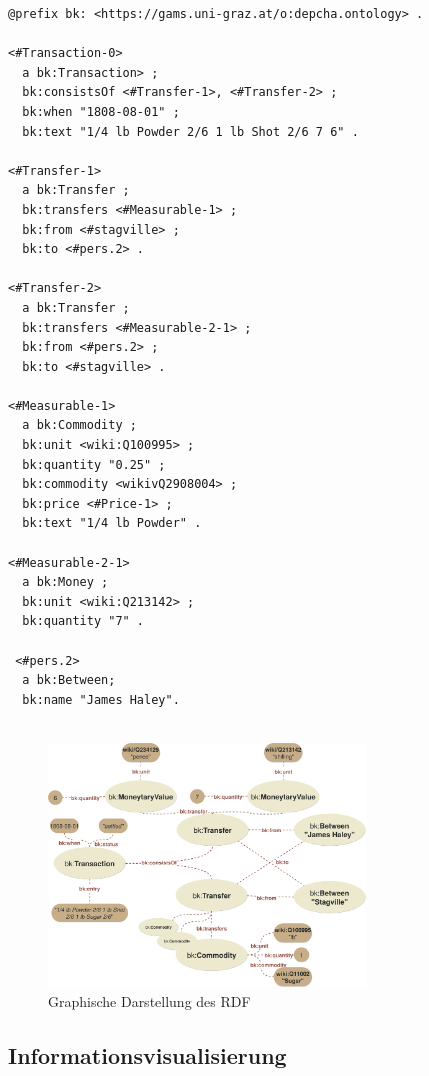 \documentclass[12pt,a4paper]{article}
\begin{document}
\begin{lstlisting}[]
@prefix bk: <https://gams.uni-graz.at/o:depcha.ontology> .

<#Transaction-0>
  a bk:Transaction> ;
  bk:consistsOf <#Transfer-1>, <#Transfer-2> ;
  bk:when "1808-08-01" ;
  bk:text "1/4 lb Powder 2/6 1 lb Shot 2/6 7 6" .

<#Transfer-1>
  a bk:Transfer ;
  bk:transfers <#Measurable-1> ;
  bk:from <#stagville> ;
  bk:to <#pers.2> .

<#Transfer-2>
  a bk:Transfer ;
  bk:transfers <#Measurable-2-1> ;
  bk:from <#pers.2> ;
  bk:to <#stagville> .

<#Measurable-1>
  a bk:Commodity ;
  bk:unit <wiki:Q100995> ;
  bk:quantity "0.25" ;
  bk:commodity <wikivQ2908004> ;
  bk:price <#Price-1> ;
  bk:text "1/4 lb Powder" .

<#Measurable-2-1>
  a bk:Money ;
  bk:unit <wiki:Q213142> ;
  bk:quantity "7" .
  
 <#pers.2>
  a bk:Between;
  bk:name "James Haley".
  
\end{lstlisting}

\begin{figure}[H]
\centering
	\includegraphics[width=0.75\textwidth]{img/example.png}  
    \caption[Graphische Darstellung des RDF, eigene Darstellung, 01.06.2019.]{Graphische Darstellung des RDF} \label{fig:example}
\end{figure}

\subsection{Informationsvisualisierung }
\end{document}
